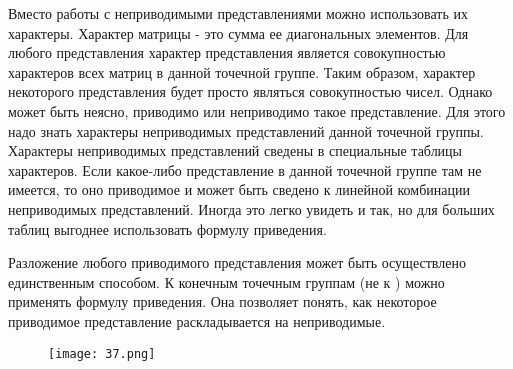 		\par\smallskip
	
	
	Вместо работы с неприводимыми представлениями можно
	использовать их характеры. Характер матрицы - это сумма ее
	диагональных элементов. Для любого представления характер
	представления является совокупностью характеров всех матриц в
	данной точечной группе. Таким образом, характер некоторого
	представления будет просто являться совокупностью чисел. Однако
	может быть неясно, приводимо или неприводимо такое
	представление. Для этого надо знать характеры неприводимых
	представлений данной точечной группы. Характеры неприводимых
	представлений сведены в специальные таблицы характеров. Если
	какое-либо представление в данной точечной группе там не
	имеется, то оно приводимое и может быть сведено к линейной
	комбинации неприводимых представлений. Иногда это легко
	увидеть и так, но для больших таблиц выгоднее использовать
	формулу приведения.
	
	
		\par\smallskip
	
	
	Разложение любого приводимого представления может быть
	осуществлено единственным способом. К конечным точечным
	группам (не к ) можно применять формулу
	приведения. Она позволяет понять, как некоторое приводимое
	представление раскладывается на неприводимые. 
	
		\begin{figure}[H]
		\centering
		{\texttt{[image: 37.png]}}
	\end{figure}
	
	\par\bigskip
	\par\bigskip
	